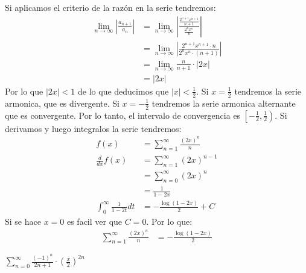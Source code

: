 \documentclass[../main.tex]{subfiles}
\begin{document}
Si aplicamos el criterio de la razón en la serie tendremos:
\begin{align*}
    \lim_{n \to \infty} \left|\frac{a_{n+1}}{a_{n}}\right| &= \lim_{n \to \infty} \left|\frac{\frac{2^{n+1} x^{n+1}}{n+1}}{\frac{2^nx^n}{n}}\right|\\
    &= \lim_{n \to \infty} \left|\frac{2^{n+1} x^{n+1} \cdot n}{2^n x^n \cdot (n+1)}\right|\\
    &= \lim_{n \to \infty} \frac{n}{n+1} \cdot |2x|\\
    &= |2x|
\end{align*}
Por lo que $|2x| <1$ de lo que deducimos que $|x| < \frac{1}{2}$. Si $x = \frac{1}{2}$ tendremos la serie armonica, que es divergente. Si $x = -\frac{1}{2}$ tendremos la serie armonica alternante que es convergente. Por lo tanto, el intervalo de convergencia es $\left[-\frac{1}{2}, \frac{1}{2}\right)$. Si derivamos y luego integralos la serie tendremos:
\begin{align*}
    f(x) &= \sum_{n = 1}^\infty \frac{(2x)^n}{n}\\
    \frac{d}{dx} f(x) &= \sum_{n = 1}^\infty (2x)^{n-1}\\
    &= \sum_{n = 0}^\infty (2x)^n\\
    &= \frac{1}{1 - 2x}\\
    \int_{0}^\infty \frac{1}{1-2t} dt &= -\frac{\log(1-2x)}{2} + C 
\end{align*} 
Si se hace $x = 0$ es facil ver que $C = 0$. Por lo que:
\begin{align*}
    \sum_{n = 1}^\infty \frac{(2x)^n}{n} &= -\frac{\log(1-2x)}{2}
\end{align*}

\question $\sum\limits_{n = 0}^\infty \frac{(-1)^n}{2n+1} \cdot \left(\frac{x}{2}\right)^{2n}$
\end{document}

